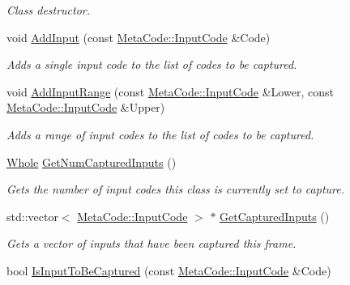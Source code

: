 \begin{DoxyCompactItemize}
\begin{DoxyCompactList}\small\item\em Class destructor. \item\end{DoxyCompactList}\item 
void \hyperlink{classphys_1_1UI_1_1InputCaptureData_a46e7c734c74bbf8983ef0e87449dd931}{AddInput} (const \hyperlink{classphys_1_1MetaCode_a3e501cbb5bf0f6f1fdb7211465bda8d8}{MetaCode::InputCode} \&Code)
\begin{DoxyCompactList}\small\item\em Adds a single input code to the list of codes to be captured. \item\end{DoxyCompactList}\item 
void \hyperlink{classphys_1_1UI_1_1InputCaptureData_af63178e71795b7a1a011c85e76c0e81d}{AddInputRange} (const \hyperlink{classphys_1_1MetaCode_a3e501cbb5bf0f6f1fdb7211465bda8d8}{MetaCode::InputCode} \&Lower, const \hyperlink{classphys_1_1MetaCode_a3e501cbb5bf0f6f1fdb7211465bda8d8}{MetaCode::InputCode} \&Upper)
\begin{DoxyCompactList}\small\item\em Adds a range of input codes to the list of codes to be captured. \item\end{DoxyCompactList}\item 
\hyperlink{namespacephys_a460f6bc24c8dd347b05e0366ae34f34a}{Whole} \hyperlink{classphys_1_1UI_1_1InputCaptureData_ac1cbd55bfa9a161f8f545679620491d8}{GetNumCapturedInputs} ()
\begin{DoxyCompactList}\small\item\em Gets the number of input codes this class is currently set to capture. \item\end{DoxyCompactList}\item 
std::vector$<$ \hyperlink{classphys_1_1MetaCode_a3e501cbb5bf0f6f1fdb7211465bda8d8}{MetaCode::InputCode} $>$ $\ast$ \hyperlink{classphys_1_1UI_1_1InputCaptureData_abe46fa1848ded1b019287da766cfda25}{GetCapturedInputs} ()
\begin{DoxyCompactList}\small\item\em Gets a vector of inputs that have been captured this frame. \item\end{DoxyCompactList}\item 
bool \hyperlink{classphys_1_1UI_1_1InputCaptureData_a2f22f9d9e8259b8687bfb5dfa8be960d}{IsInputToBeCaptured} (const \hyperlink{classphys_1_1MetaCode_a3e501cbb5bf0f6f1fdb7211465bda8d8}{MetaCode::InputCode} \&Code)

\end{DoxyCompactItemize}
